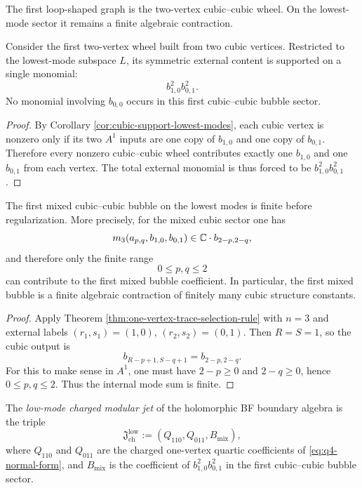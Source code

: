 The first loop-shaped graph is the two-vertex cubic--cubic wheel. On the lowest-mode sector it remains a finite algebraic contraction.

\begin{theorem}
\label{thm:support-first-mixed-cubic-cubic-bubble}
Consider the first two-vertex wheel built from two cubic vertices. Restricted to the lowest-mode
subspace $L$, its symmetric external content is supported on a single monomial:
\[
b_{1,0}^2 b_{0,1}^2.
\]
No monomial involving $b_{0,0}$ occurs in this first cubic--cubic bubble sector.
\end{theorem}

\begin{proof}
By Corollary \ref{cor:cubic-support-lowest-modes}, each cubic vertex is nonzero only if its two
$A^1$ inputs are one copy of $b_{1,0}$ and one copy of $b_{0,1}$. Therefore every nonzero
cubic--cubic wheel contributes exactly one $b_{1,0}$ and one $b_{0,1}$ from each vertex. The
total external monomial is thus forced to be $b_{1,0}^2b_{0,1}^2$.
\end{proof}

\begin{theorem}
\label{thm:exceptional-finiteness-first-mixed-bubble}
The first mixed cubic--cubic bubble on the lowest modes is finite before regularization. More
precisely, for the mixed cubic sector one has
\[
m_3(a_{p,q},b_{1,0},b_{0,1})\in \mathbb C\cdot b_{2-p,2-q},
\]
and therefore only the finite range
\[
0\le p,q\le 2
\]
can contribute to the first mixed bubble coefficient. In particular, the first mixed bubble is a
finite algebraic contraction of finitely many cubic structure constants.
\end{theorem}

\begin{proof}
Apply Theorem \ref{thm:one-vertex-trace-selection-rule} with $n=3$ and external labels
$(r_1,s_1)=(1,0)$, $(r_2,s_2)=(0,1)$. Then $R=S=1$, so the cubic output is
\[
b_{R-p+1,S-q+1}=b_{2-p,2-q}.
\]
For this to make sense in $A^1$, one must have $2-p\ge 0$ and $2-q\ge 0$, hence
$0\le p,q\le 2$. Thus the internal mode sum is finite.
\end{proof}

\begin{definition}
\label{def:low-mode-charged-modular-jet}
The \emph{low-mode charged modular jet} of the holomorphic BF boundary algebra is the triple
\begin{equation}
\label{eq:charged-modular-jet}
\mathfrak J_{\mathrm{ch}}^{\mathrm{low}}:=(Q_{110},Q_{011},B_{\mathrm{mix}}),
\end{equation}
where $Q_{110}$ and $Q_{011}$ are the charged one-vertex quartic coefficients of
\eqref{eq:q4-normal-form}, and $B_{\mathrm{mix}}$ is the coefficient of
$b_{1,0}^2b_{0,1}^2$ in the first cubic--cubic bubble sector.
\end{definition}

